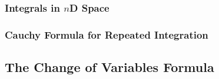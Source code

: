 

\subsubsection{Integrals in $n$D Space}



\subsubsection{Cauchy Formula for Repeated Integration} 




%
%
%





\subsection{The Change of Variables Formula}

